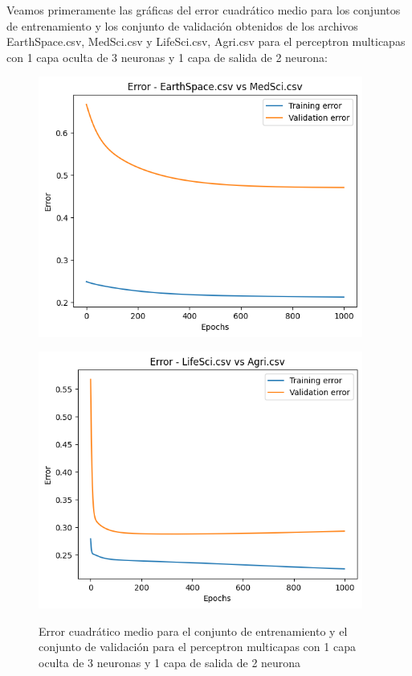 \documentclass{article}
\theoremstyle{mytheoremstyle}
\theoremstyle{mytheoremstyle}
\theoremstyle{myproblemstyle}
\begin{document}
Veamos primeramente las gráficas del error cuadrático medio para los conjuntos de entrenamiento y los conjunto de validación obtenidos de los archivos EarthSpace.csv, MedSci.csv y LifeSci.csv, Agri.csv para el perceptron multicapas con 1 capa oculta de 3 neuronas y 1 capa de salida de 2 neurona:

\begin{figure}[!h]
  \begin{minipage}[b]{0.45\textwidth}
    \centering
    \includegraphics[width=0.95\textwidth]{./img/output.png}
    \label{fig:1}

  \end{minipage}
  \begin{minipage}[b]{0.45\textwidth}
    \centering
    \includegraphics[width=0.95\textwidth]{./img/output2.png}
    \label{fig:2}
  \end{minipage}
  \caption{Error cuadrático medio para el conjunto de entrenamiento y el conjunto de validación para el perceptron multicapas con 1 capa oculta de 3 neuronas y 1 capa de salida de 2 neurona}
\end{figure}
\end{document}
